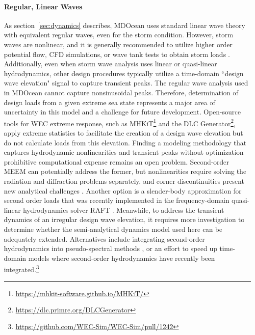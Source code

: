 \paragraph{Regular, Linear Waves}
As section~\ref{sec:dynamics} describes, MDOcean uses standard linear wave theory with equivalent regular waves, even for the storm condition. However, storm waves are nonlinear, and it is generally recommended to utilize higher order potential flow, CFD simulations, or wave tank tests to obtain storm loads \cite{coe_survey_2018}. Additionally, even when storm wave analysis uses linear or quasi-linear hydrodynamics, other design procedures typically utilize a time-domain ``design wave elevation" signal to capture transient peaks. The regular wave analysis used in MDOcean cannot capture nonsinusoidal peaks. Therefore, determination of design loads from a given extreme sea state represents a major area of uncertainty in this model and a challenge for future development. Open-source tools for WEC extreme response, such as MHKiT\footnote{\url{https://mhkit-software.github.io/MHKiT/}} and the DLC Generator\footnote{\url{https://dlc.primre.org/DLCGenerator}}, apply extreme statistics to facilitate the creation of a design wave elevation but do not calculate loads from this elevation. Finding a modeling methodology that captures hydrodynamic nonlinearities and transient peaks without optimization-prohibitive computational expense remains an open problem. Second-order MEEM can potentially address the former, but nonlinearities require solving the radiation and diffraction problems separately, and corner discontinuities present new analytical challenges \cite{cong_novel_2020,mavrakos_second-order_2009}. Another option is a slender-body approximation for second order loads that was recently implemented in the frequency-domain quasi-linear hydrodynamics solver RAFT \cite{carmo_slender-body_2025}. Meanwhile, to address the transient dynamics of an irregular design wave elevation, it requires more investigation to determine whether the semi-analytical dynamics model used here can be adequately extended. Alternatives include integrating second-order hydrodynamics into pseudo-spectral methods \cite{coe_initial_2020}, or an effort to speed up time-domain models where second-order hydrodynamics have recently been integrated.\footnote{\url{https://github.com/WEC-Sim/WEC-Sim/pull/1242}}

